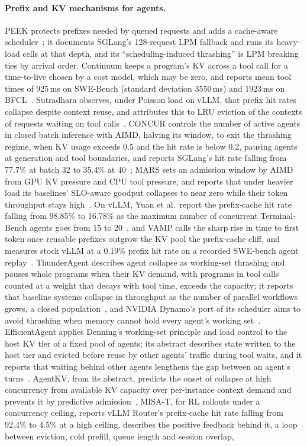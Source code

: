 \paragraph{Prefix and KV mechanisms for agents.} PEEK protects prefixes needed by queued requests and adds a cache-aware scheduler~\citep{xie2026peek}; it documents SGLang's 128-request LPM fallback and runs its heavy-load cells at that depth, and its ``scheduling-induced thrashing'' is LPM breaking ties by arrival order. Continuum keeps a program's KV across a tool call for a time-to-live chosen by a cost model, which may be zero, and reports mean tool times of 925\,ms on SWE-Bench (standard deviation 3550\,ms) and 1923\,ms on BFCL~\citep{li2025continuum,patil2025bfcl}. Sutradhara observes, under Poisson load on vLLM, that prefix hit rates collapse despite context reuse, and attributes this to LRU eviction of the contexts of requests waiting on tool calls~\citep{biswas2026sutradhara}. CONCUR controls the number of active agents in closed batch inference with AIMD, halving its window, to exit the thrashing regime, when KV usage exceeds 0.5 and the hit rate is below 0.2, pausing agents at generation and tool boundaries, and reports SGLang's hit rate falling from 77.7\% at batch 32 to 35.4\% at 40~\citep{chen2026concur}; MARS sets an admission window by AIMD from GPU KV pressure and CPU tool pressure, and reports that under heavier load its baselines' SLO-aware goodput collapses to near zero while their token throughput stays high~\citep{wang2026mars}. On vLLM, Yuan et al.\ report the prefix-cache hit rate falling from 98.85\% to 16.78\% as the maximum number of concurrent Terminal-Bench agents goes from 15 to 20~\citep{yuan2026agentic}, and VAMP calls the sharp rise in time to first token once reusable prefixes outgrow the KV pool the prefix-cache cliff, and measures stock vLLM at a 0.19\% prefix hit rate on a recorded SWE-bench agent replay~\citep{kim2026vamp}. ThunderAgent describes agent collapse as working-set thrashing and pauses whole programs when their KV demand, with programs in tool calls counted at a weight that decays with tool time, exceeds the capacity; it reports that baseline systems collapse in throughput as the number of parallel workflows grows, a closed population~\citep{kang2026thunderagent}, and NVIDIA Dynamo's port of its scheduler aims to avoid thrashing when memory cannot hold every agent's working set~\citep{dhanani2026dynamo}. EfficientAgent applies Denning's working-set principle and load control to the host KV tier of a fixed pool of agents; its abstract describes state written to the host tier and evicted before reuse by other agents' traffic during tool waits, and it reports that waiting behind other agents lengthens the gap between an agent's turns~\citep{shao2026efficientagent}. AgentKV, from its abstract, predicts the onset of collapse at high concurrency from available KV capacity over per-instance context demand and prevents it by predictive admission~\citep{anon2026agentkv}. MISA-T, for RL rollouts under a concurrency ceiling, reports vLLM Router's prefix-cache hit rate falling from 92.4\% to 4.5\% at a high ceiling, describes the positive feedback behind it, a loop between eviction, cold prefill, queue length and session overlap, 